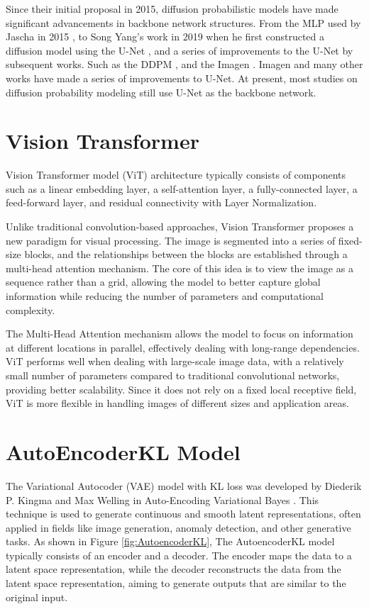 \documentclass[12pt]{report}
\begin{document}
Since their initial proposal in 2015, diffusion probabilistic models have made significant advancements in backbone network structures. From the MLP used by Jascha in 2015 \cite{sohl2015deep}, to Song Yang's work in 2019 when he first constructed a diffusion model using the U-Net \cite{song2019generative}, and a series of improvements to the U-Net by subsequent works. Such as the DDPM \cite{ho2020denoising}, and the Imagen \cite{saharia2022photorealistic}. Imagen and many other works have made a series of improvements to U-Net. At present, most studies on diffusion probability modeling still use U-Net as the backbone network.

\section{Vision Transformer}
Vision Transformer model (ViT) \cite{dosovitskiy2020image} architecture typically consists of components such as a linear embedding layer, a self-attention layer, a fully-connected layer, a feed-forward layer, and residual connectivity with Layer Normalization.

Unlike traditional convolution-based approaches, Vision Transformer proposes a new paradigm for visual processing. The image is segmented into a series of fixed-size blocks, and the relationships between the blocks are established through a multi-head attention mechanism. The core of this idea is to view the image as a sequence rather than a grid, allowing the model to better capture global information while reducing the number of parameters and computational complexity.

The Multi-Head Attention mechanism allows the model to focus on information at different locations in parallel, effectively dealing with long-range dependencies. ViT performs well when dealing with large-scale image data, with a relatively small number of parameters compared to traditional convolutional networks, providing better scalability. Since it does not rely on a fixed local receptive field, ViT is more flexible in handling images of different sizes and application areas.

\section{AutoEncoderKL Model}
The Variational Autocoder (VAE) model with KL loss was developed by Diederik P. Kingma and Max Welling in Auto-Encoding Variational Bayes \cite{kingma2013auto}. This technique is used to generate continuous and smooth latent representations, often applied in fields like image generation, anomaly detection, and other generative tasks. As shown in Figure \ref{fig:AutoencoderKL}, The AutoencoderKL model typically consists of an encoder and a decoder. The encoder maps the data to a latent space representation, while the decoder reconstructs the data from the latent space representation, aiming to generate outputs that are similar to the original input.
\end{document}
